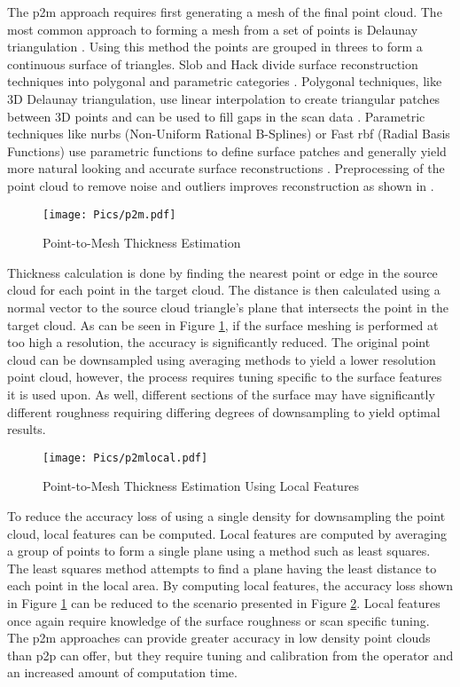 The \acrshort{p2m} approach requires first generating a mesh of the final point cloud. The most common approach to forming a mesh from a set of points is Delaunay triangulation \cite{delaunay}. Using this method the points are grouped in threes to form a continuous surface of triangles. Slob and Hack divide surface reconstruction techniques into polygonal and parametric categories \cite{mesh1}. Polygonal techniques, like 3D Delaunay triangulation, use linear interpolation to create triangular patches between 3D points and can be used to fill gaps in the scan data \cite{mesh3}. Parametric techniques like \acrshort{nurbs} (Non-Uniform Rational B-Splines) or Fast \acrshort{rbf} (Radial Basis Functions) use parametric functions to define surface patches and generally yield more natural looking and accurate surface reconstructions \cite{mesh1}. Preprocessing of the point cloud to remove noise and outliers improves reconstruction as shown in \cite{mesh2}.\\
\label{sec:p2m}
\begin{figure}[h!]
    \centering
    \texttt{[image: Pics/p2m.pdf]}
    \caption{Point-to-Mesh Thickness Estimation}
    \label{fig:p2mdia}
\end{figure}
\clearpage

Thickness calculation is done by finding the nearest point or edge in the source cloud for each point in the target cloud. The distance is then calculated using a normal vector to the source cloud triangle's plane that intersects the point in the target cloud. As can be seen in Figure \ref{fig:p2mdia}, if the surface meshing is performed at too high a resolution, the accuracy is significantly reduced. The original point cloud can be downsampled using averaging methods to yield a lower resolution point cloud, however, the process requires tuning specific to the surface features it is used upon. As well, different sections of the surface may have significantly different roughness requiring differing degrees of downsampling to yield optimal results.\\
\begin{figure}[h!]
    \centering
    \texttt{[image: Pics/p2mlocal.pdf]}
    \caption{Point-to-Mesh Thickness Estimation Using Local Features}
    \label{fig:p2mlocaldia}
\end{figure}
\clearpage

To reduce the accuracy loss of using a single density for downsampling the point cloud, local features can be computed. Local features are computed by averaging a group of points to form a single plane using a method such as least squares. The least squares method attempts to find a plane having the least distance to each point in the local area. By computing local features, the accuracy loss shown in Figure \ref{fig:p2mdia} can be reduced to the scenario presented in Figure \ref{fig:p2mlocaldia}. Local features once again require knowledge of the surface roughness or scan specific tuning. The \acrshort{p2m} approaches can provide greater accuracy in low density point clouds than \acrshort{p2p} can offer, but they require tuning and calibration from the operator and an increased amount of computation time.\\
